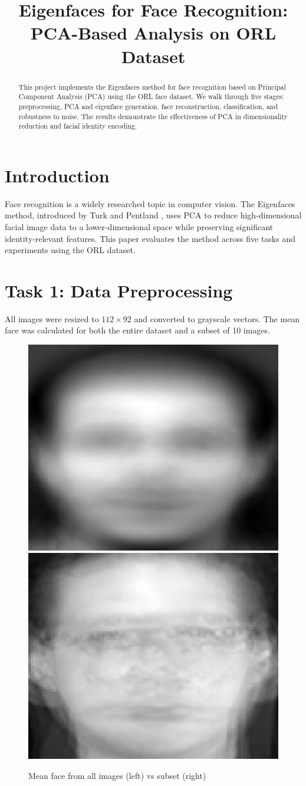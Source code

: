 \documentclass[conference]{IEEEtran}
\title{Eigenfaces for Face Recognition: PCA-Based Analysis on ORL Dataset}
\author{\IEEEauthorblockN{Emircan Sarı}
\IEEEauthorblockA{Istanbul Technical University \\
\texttt{sariem22@itu.edu.tr}}
}
\begin{document}
\maketitle

\begin{abstract}
This project implements the Eigenfaces method for face recognition based on Principal Component Analysis (PCA) using the ORL face dataset. We walk through five stages: preprocessing, PCA and eigenface generation, face reconstruction, classification, and robustness to noise. The results demonstrate the effectiveness of PCA in dimensionality reduction and facial identity encoding.
\end{abstract}

\section{Introduction}
Face recognition is a widely researched topic in computer vision. The Eigenfaces method, introduced by Turk and Pentland \cite{turk1991eigenfaces}, uses PCA to reduce high-dimensional facial image data to a lower-dimensional space while preserving significant identity-relevant features. This paper evaluates the method across five tasks and experiments using the ORL dataset.

\section{Task 1: Data Preprocessing}
All images were resized to \(112 \times 92\) and converted to grayscale vectors. The mean face was calculated for both the entire dataset and a subset of 10 images.

\begin{figure}[htbp]
\centering
\includegraphics[width=0.4\linewidth]{mean_face_all.png}
\includegraphics[width=0.4\linewidth]{mean_face_subset.png}
\caption{Mean face from all images (left) vs subset (right)}
\end{figure}
\end{document}
